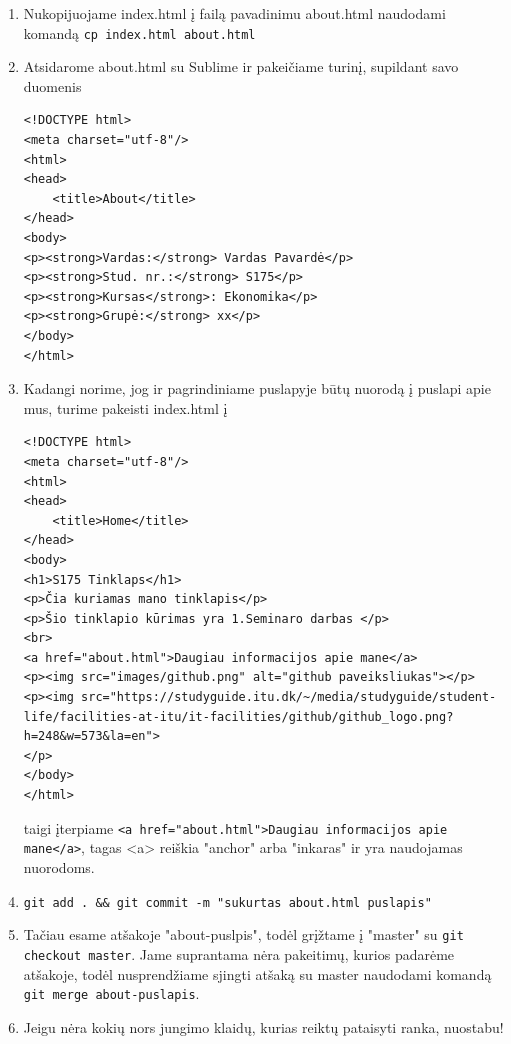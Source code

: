 \documentclass[12pt,a4paper]{article}
\begin{document}
\begin{enumerate}
\item Nukopijuojame index.html į failą pavadinimu about.html naudodami komandą
\colorbox{listinggray}{\lstinline|cp index.html about.html|}

\item Atsidarome about.html su Sublime ir pakeičiame turinį, supildant savo duomenis

\begin{lstlisting}
<!DOCTYPE html>
<meta charset="utf-8"/>
<html>
<head>
	<title>About</title>
</head>
<body>
<p><strong>Vardas:</strong> Vardas Pavardė</p>
<p><strong>Stud. nr.:</strong> S175</p>
<p><strong>Kursas</strong>: Ekonomika</p>
<p><strong>Grupė:</strong> xx</p>
</body>
</html>
\end{lstlisting}

\item Kadangi norime, jog ir pagrindiniame puslapyje būtų nuorodą į puslapi apie mus, turime pakeisti index.html į

\begin{lstlisting}
<!DOCTYPE html>
<meta charset="utf-8"/>
<html>
<head>
	<title>Home</title>
</head>
<body>
<h1>S175 Tinklaps</h1>
<p>Čia kuriamas mano tinklapis</p>
<p>Šio tinklapio kūrimas yra 1.Seminaro darbas </p>
<br>
<a href="about.html">Daugiau informacijos apie mane</a>
<p><img src="images/github.png" alt="github paveiksliukas"></p>
<p><img src="https://studyguide.itu.dk/~/media/studyguide/student-life/facilities-at-itu/it-facilities/github/github_logo.png?h=248&w=573&la=en">
</p>
</body>
</html>
\end{lstlisting}

taigi įterpiame \colorbox{listinggray}{\lstinline|<a href="about.html">Daugiau informacijos apie mane</a>|}, tagas <a> reiškia "anchor" arba "inkaras" ir yra  naudojamas nuorodoms. 

\item \colorbox{listinggray}{\lstinline|git add . && git commit -m "sukurtas about.html puslapis"|}  

\item Tačiau esame atšakoje "about-puslpis", todėl grįžtame į "master" su \colorbox{listinggray}{\lstinline|git checkout master|}. Jame suprantama nėra pakeitimų, kurios padarėme atšakoje, todėl nusprendžiame sjingti atšaką su master naudodami komandą
\colorbox{listinggray}{\lstinline|git merge about-puslapis|}.

\item Jeigu nėra kokių nors jungimo klaidų, kurias reiktų pataisyti ranka, nuostabu!


\end{enumerate}
\end{document}
